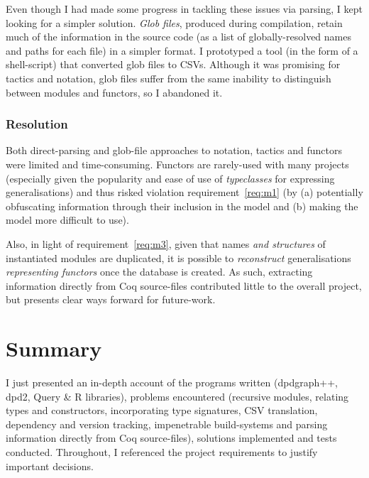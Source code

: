 Even though I had made some progress in tackling these issues via parsing, I
kept looking for a simpler solution. \emph{Glob files}, produced during
compilation, retain much of the information in the source code (as a list of
globally-resolved names and paths for each file) in a simpler format. I
prototyped a tool (in the form of a shell-script) that converted glob files to
CSVs. Although it was promising for tactics and notation, glob files suffer from
the same inability to distinguish between modules and functors, so I abandoned
it.

\subsubsection{Resolution}

Both direct-parsing and glob-file approaches to notation, tactics and functors
were limited and time-consuming. Functors are rarely-used with many projects
(especially given the popularity and ease of use of \emph{typeclasses} for
expressing generalisations) and thus risked violation requirement~\ref{req:m1}
(by (a) potentially obfuscating information through their inclusion in the model
and (b) making the model more difficult to use).

Also, in light of requirement~\ref{req:m3}, given that names \emph{and
structures} of instantiated modules are duplicated, it is possible to
\emph{reconstruct} generalisations \emph{representing functors} once the
database is created. As such, extracting information directly from Coq
source-files contributed little to the overall project, but presents clear ways
forward for future-work.

\section{Summary}

I just presented an in-depth account of the programs written (dpdgraph++, dpd2,
Query \& R libraries), problems encountered (recursive modules, relating types
and constructors, incorporating type signatures, CSV translation, dependency and
version tracking, impenetrable build-systems and parsing information directly
from Coq source-files), solutions implemented and tests conducted. Throughout, I
referenced the project requirements to justify important decisions.

